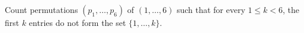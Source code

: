 Count permutations $(p_1,\ldots,p_6)$ of $(1,\ldots,6)$ such that for every $1\le k<6$, the first $k$ entries do not form the set $\{1,\ldots,k\}$.
